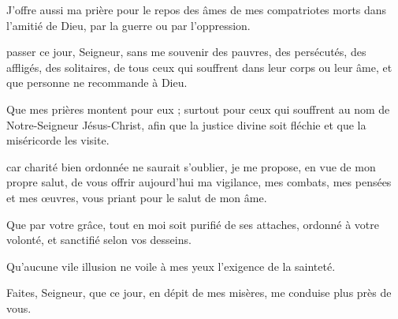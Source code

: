 J’offre aussi ma prière pour le repos des âmes de mes compatriotes morts dans l’amitié de Dieu, par la guerre ou par l’oppression.

\culdelampe

 passer ce jour, Seigneur, sans me souvenir des pauvres, des persécutés, des affligés, des solitaires, de tous ceux qui souffrent dans leur corps ou leur âme, et que personne ne recommande à Dieu.

Que mes prières montent pour eux ; surtout pour ceux qui souffrent au nom de Notre-Seigneur Jésus-Christ, afin que la justice divine soit fléchie et que la miséricorde les visite.

\culdelampe

 car charité bien ordonnée ne saurait s’oublier, je me propose, en vue de mon propre salut, de vous offrir aujourd’hui ma vigilance, mes combats, mes pensées et mes œuvres, vous priant pour le salut de mon âme.

Que par votre grâce, tout en moi soit purifié de ses attaches, ordonné à votre volonté, et sanctifié selon vos desseins.

Qu’aucune vile illusion ne voile à mes yeux l’exigence de la sainteté.

Faites, Seigneur, que ce jour, en dépit de mes misères, me conduise plus près de vous.

